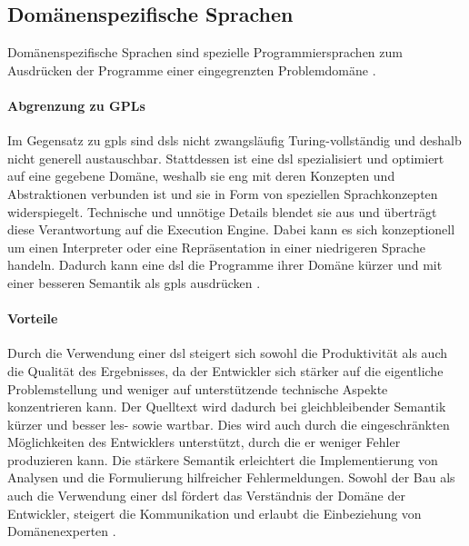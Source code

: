 \subsection{Domänenspezifische Sprachen}
    Domänenspezifische Sprachen
    sind spezielle Programmiersprachen zum Ausdrücken der Programme einer eingegrenzten
    Problemdomäne \cite[Kapitel 2.2]{voelter:DslEngineering}.

    \paragraph{Abgrenzung zu GPLs}
    Im Gegensatz zu \glspl{gpl} sind \glspl{dsl} nicht zwangsläufig Turing-vollständig
    und deshalb nicht generell austauschbar.
    Stattdessen ist eine \gls{dsl} spezialisiert und optimiert auf eine gegebene Domäne,
    weshalb sie eng mit deren Konzepten und Abstraktionen verbunden ist
    und sie in Form von speziellen Sprachkonzepten widerspiegelt.
    Technische und unnötige Details blendet sie aus und überträgt diese Verantwortung
    auf die Execution Engine.
    Dabei kann es sich konzeptionell um einen Interpreter oder eine Repräsentation in einer
    niedrigeren Sprache handeln.
    Dadurch kann eine \gls{dsl} die Programme ihrer Domäne kürzer und mit einer besseren Semantik
    als \glspl{gpl} ausdrücken \cite[Kapitel 2.2]{voelter:DslEngineering}.

    \paragraph{Vorteile}
    Durch die Verwendung einer \gls{dsl} steigert sich sowohl die Produktivität
    als auch die Qualität des Ergebnisses,
    da der Entwickler sich stärker auf die eigentliche Problemstellung und weniger
    auf unterstützende technische Aspekte konzentrieren kann.
    Der Quelltext wird dadurch bei gleichbleibender Semantik kürzer und besser les- sowie wartbar.
    Dies wird auch durch die eingeschränkten Möglichkeiten des Entwicklers unterstützt,
    durch die er weniger Fehler produzieren kann.
    Die stärkere Semantik erleichtert die Implementierung von Analysen und die Formulierung
    hilfreicher Fehlermeldungen.
    Sowohl der Bau als auch die Verwendung einer \gls{dsl} fördert das Verständnis der Domäne
    der Entwickler, steigert die Kommunikation und erlaubt die Einbeziehung von Domänenexperten
    \cite[Kapitel 2.5]{voelter:DslEngineering}.

